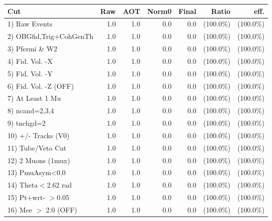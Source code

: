  \begin{table}[h!]\centering
 \begin{tabular}{||l||r|r|r|r|r|r||}
 \hline
 \hline
 Cut & Raw & AOT & Norm0 & Final & Ratio & eff.       \\
 \hline
  1) Raw Events           &          1.0 &          1.0 &          0.0 &          0.0 & (100.0\%) & (100.0\%) \\
  2) OBGfid,Trig+CohGenTh &          1.0 &          1.0 &          0.0 &          0.0 & (100.0\%) & (100.0\%) \\
  3) Pfermi \& W2         &          1.0 &          1.0 &          0.0 &          0.0 & (100.0\%) & (100.0\%) \\
  4) Fid. Vol. -X         &          1.0 &          1.0 &          0.0 &          0.0 & (100.0\%) & (100.0\%) \\
  5) Fid. Vol. -Y         &          1.0 &          1.0 &          0.0 &          0.0 & (100.0\%) & (100.0\%) \\
  6) Fid. Vol. -Z (OFF)   &          1.0 &          1.0 &          0.0 &          0.0 & (100.0\%) & (100.0\%) \\
  7) At Least 1 Mu        &          1.0 &          1.0 &          0.0 &          0.0 & (100.0\%) & (100.0\%) \\
  8) ncand=2,3,4          &          1.0 &          1.0 &          0.0 &          0.0 & (100.0\%) & (100.0\%) \\
  9) tnchgd=2             &          1.0 &          1.0 &          0.0 &          0.0 & (100.0\%) & (100.0\%) \\
 10) +/- Tracks (V0)      &          1.0 &          1.0 &          0.0 &          0.0 & (100.0\%) & (100.0\%) \\
 11) Tube/Veto Cut        &          1.0 &          1.0 &          0.0 &          0.0 & (100.0\%) & (100.0\%) \\
 12) 2 Muons (1mux)       &          1.0 &          1.0 &          0.0 &          0.0 & (100.0\%) & (100.0\%) \\
 13) PmuAsym<0.0          &          1.0 &          1.0 &          0.0 &          0.0 & (100.0\%) & (100.0\%) \\
 14) Theta$<$2.62 rad     &          1.0 &          1.0 &          0.0 &          0.0 & (100.0\%) & (100.0\%) \\
 15) Pt+wrt- $>$0.05      &          1.0 &          1.0 &          0.0 &          0.0 & (100.0\%) & (100.0\%) \\
 16) Mee $>$ 2.0  (OFF)   &          1.0 &          1.0 &          0.0 &          0.0 & (100.0\%) & (100.0\%) \\

\end{tabular}
\end{table}

